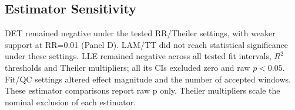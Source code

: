 \documentclass[conference,a4paper]{IEEEtran}
\begin{document}
\subsection{Estimator Sensitivity}
\label{sec:supp_6_3}

DET remained negative under the tested RR/Theiler settings, with weaker support at RR=0.01 (Panel D). LAM/TT did not reach statistical significance under these settings. LLE remained negative across all tested fit intervals, $R^2$ thresholds and Theiler multipliers; all its CIs excluded zero and raw $p<0.05$. Fit/QC settings altered effect magnitude and the number of accepted windows. These estimator comparisons report raw p only. Theiler multipliers scale the nominal exclusion of each estimator.

\end{document}
